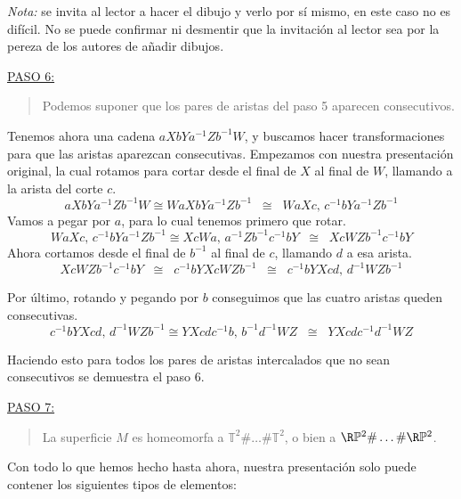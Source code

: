 {    \vspace{0.5em}
    \noindent
    \textit{Nota:} se invita al lector a hacer el dibujo y verlo por sí mismo, en este caso no es difícil. No se puede confirmar ni desmentir que la invitación al lector sea por la pereza de los autores de añadir dibujos. 

    \vspace{1.3em}
    \noindent
    \underline{PASO 6:}
    \begin{quote}
        Podemos suponer que los pares de aristas del paso 5 aparecen consecutivos.
    \end{quote}

    \noindent
    Tenemos ahora una cadena $aXbYa^{-1}Zb^{-1}W$, 
    y buscamos hacer transformaciones para que las aristas aparezcan consecutivas. 
    Empezamos con nuestra presentación original, la cual rotamos para cortar desde el final de $X$ al final de $W$, llamando a la arista del corte $c$. 
    \[
        aXbYa^{-1}Zb^{-1}W \cong WaXbYa^{-1}Zb^{-1} \;\;\cong\;\; WaXc \text{, } c^{-1}bYa^{-1}Zb^{-1}
    \]
    \noindent 
    Vamos a pegar por $a$, para lo cual tenemos primero que rotar.
    \[
        WaXc \text{, } c^{-1}bYa^{-1}Zb^{-1} \cong XcWa \text{, } a^{-1}Zb^{-1}c^{-1}bY \;\;\cong\;\; XcWZb^{-1}c^{-1}bY
    \] 
    \noindent
    Ahora cortamos desde el final de $b^{-1}$ al final de $c$, llamando $d$ a esa arista. 
    \[
        XcWZb^{-1}c^{-1}bY \;\;\cong\;\; c^{-1}bYXcWZb^{-1} \;\;\cong\;\; c^{-1}bYXcd \text{, } d^{-1}WZb^{-1}
    \]

    \noindent
    Por último, rotando y pegando por $b$ conseguimos que las cuatro aristas queden consecutivas.
    \[
        c^{-1}bYXcd \text{, } d^{-1}WZb^{-1} \cong YXcdc^{-1}b \text{, } b^{-1}d^{-1}WZ \;\;\cong\;\; YXcdc^{-1}d^{-1}WZ
    \]

    \vspace{0.5em}
    \noindent
    Haciendo esto para todos los pares de aristas intercalados que no sean consecutivos se demuestra el paso 6.

    \vspace{1.3em}
    \noindent
    \underline{PASO 7:}
    \begin{quote}
        La superficie $M$ es homeomorfa a $\mathbb{T}^2\#\dots\#\mathbb{T}^2$, o bien a $\R\mathbb{P}^2\#\dots\#\R\mathbb{P}^2$.
    \end{quote}

    \noindent
    Con todo lo que hemos hecho hasta ahora, nuestra presentación solo puede contener los siguientes tipos de elementos:

}
